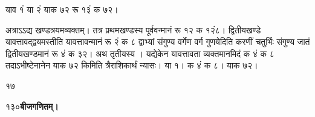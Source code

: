 \documentclass[11pt, openany]{book}
\begin{document}
\begin{sloppypar}
\begin{center}
याव १ं या २ं याक ७२ रू १३ं क ७२।\\
\end{center}

\hangindent=0.2in \hspace{0.2in}अत्राऽऽद्य खण्डत्रयमव्यक्तम्। तत्र प्रथमखण्डस्य पूर्ववन्मानं रू १२ क १२ं८। द्वितीयखण्डे \\यावत्तावद्द्वयमस्तीति यावत्तावन्मानं रू २ं क ८ द्वाभ्यां संगुण्य वर्गेण वर्ग गुणयेदिति करणीं चतुर्भिः संगुण्य जातं द्वितीयखण्डमानं रू ४ं क ३२। अथ तृतीयस्य । यद्येकेन यावत्तावता व्यक्तमानमिदं क ४ं क ८ तदाऽभीष्टेनानेन याक ७२ किमिति त्रैराशिकार्थं न्यासः। या १। क ४ं क ८। याक ७२।

\hspace{0.25in}१७
\end{sloppypar}
\thispagestyle{empty}
\newpage

\onehalfspacing
 १३०\hspace{2in}\textbf{बीजगणितम्।} 

\vspace{5mm}
\end{document}
